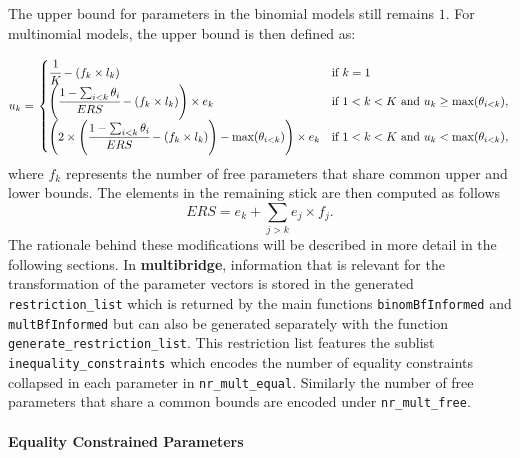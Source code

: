 \begin{appendix}
The upper bound for parameters in the binomial models still remains
\(1\). For multinomial models, the upper bound is then defined as:

\begin{align}
  u_k = \left.
  \begin{cases}
      \cfrac{1}{K} - (f_k \times l_k) & \text{if } k = 1 \\
     \left( \cfrac{1 - \sum_{i < k} \theta_i}{ERS} - (f_k \times l_k) \right) \times e_k & \text{if } 1 < k < K \text{ and } u_k \geq \text{max}(\theta_{i < k}), \\
    \left( 2 \times \left( \cfrac{1 - \sum_{i < k} \theta_i}{ERS} - (f_k \times l_k) \right) - \text{max}(\theta_{i < k}) \right)  \times e_k & \text{if } 1 < k < K \text{ and } u_k < \text{max}(\theta_{i < k}),
  \end{cases}
    \right.
\end{align} where \(f_k\) represents the number of free parameters that
share common upper and lower bounds. The elements in the remaining stick
are then computed as follows
\[ERS = e_k + \sum_{j > k} e_j \times f_j.\] The rationale behind these
modifications will be described in more detail in the following
sections. In \textbf{multibridge}, information that is relevant for the
transformation of the parameter vectors is stored in the generated
\texttt{restriction\_list} which is returned by the main functions
\texttt{binomBfInformed} and \texttt{multBfInformed} but can also be
generated separately with the function \texttt{generate_restriction_list}.
This restriction list features the sublist
\texttt{inequality\_constraints} which encodes the number of equality
constraints collapsed in each parameter in \texttt{nr\_mult\_equal}.
Similarly the number of free parameters that share a common bounds are
encoded under \texttt{nr\_mult\_free}.

\hypertarget{equality-constrained-parameters}{%
\paragraph{Equality Constrained
Parameters}\label{equality-constrained-parameters}}


\end{appendix}
